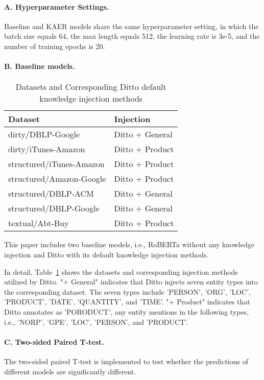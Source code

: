 \paragraph{A. Hyperparameter Settings.} 
Baseline and KAER models share the same hyperparameter setting, in which the batch size equals 64, the max length equals 512, the learning rate is 3e-5, and the number of training epochs is 20. 

\paragraph{B. Baseline models.} 
\begin{table}[!b]
\centering
\begin{tabular}{|l|l|}
\hline
Dataset                  & Injection       \\ \hline
dirty/DBLP-Google        & Ditto + General \\ \hline
dirty/iTunes-Amazon      & Ditto + Product \\ \hline
structured/iTunes-Amazon & Ditto + Product \\ \hline
structured/Amazon-Google & Ditto + Product \\ \hline
structured/DBLP-ACM      & Ditto + General \\ \hline
structured/DBLP-Google   & Ditto + General \\ \hline
textual/Abt-Buy          & Ditto + Product \\ \hline
\end{tabular}
\caption{Datasets and Corresponding Ditto default knowledge injection methods}
\label{tab:dittoinject}
\end{table}
This paper includes two baseline models, i.e., RoBERTa without any knowledge injection and Ditto with its default knowledge injection methods. 

In detail, Table~\ref{tab:dittoinject} shows the datasets and corresponding injection methods utilized by Ditto. "+ General" indicates that Ditto injects seven entity types into the corresponding dataset. The seven types include 'PERSON', 'ORG', 'LOC', 'PRODUCT', 'DATE', 'QUANTITY', and 'TIME'. "+ Product" indicates that Ditto annotates as 'PORODUCT', any entity mentions in the following types, i.e., 'NORP', 'GPE', 'LOC', 'PERSON', and 'PRODUCT'.

\paragraph{C. Two-sided Paired T-test.}
The two-sided paired T-test is implemented to test whether the predictions of different models are significantly different. 
